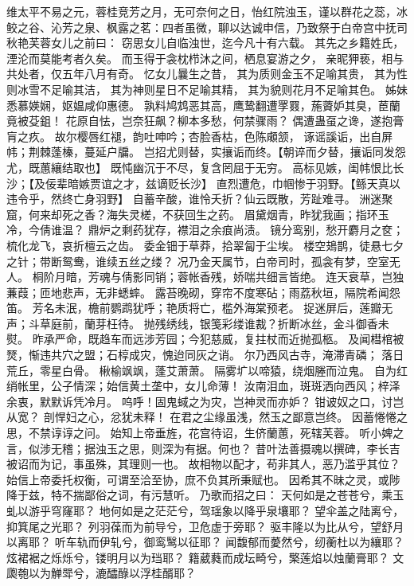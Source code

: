 \documentclass[12pt,oneside]{book}
\begin{document}
维太平不易之元，蓉桂竞芳之月，无可奈何之日，怡红院浊玉，谨以群花之蕊，冰鲛之谷、沁芳之泉、枫露之茗：四者虽微，聊以达诚申信，乃致祭于白帝宫中抚司秋艳芙蓉女儿之前曰：
窃思女儿自临浊世，迄今凡十有六载。
其先之乡籍姓氏，湮沦而莫能考者久矣。
而玉得于衾枕栉沐之间，栖息宴游之夕，
亲昵狎亵，相与共处者，仅五年八月有奇。
忆女儿曩生之昔，
其为质则金玉不足喻其贵，
其为性则冰雪不足喻其洁，
其为神则星日不足喻其精，
其为貌则花月不足喻其色。
姊妹悉慕媖娴，妪媪咸仰惠德。
孰料鸠鸩恶其高，鹰鸷翻遭罦罬，葹薋妒其臭，茞蘭竟被芟鉏！
花原自怯，岂奈狂飙？柳本多愁，何禁骤雨？
偶遭蛊虿之谗，遂抱膏肓之疚。
故尔樱唇红褪，韵吐呻吟；杏脸香枯，色陈顑颔，
诼谣謑诟，出自屏帏；荆棘蓬榛，蔓延户牖。
岂招尤则替，实攘诟而终。【朝谇而夕替，攘诟同发怨尤，既蕙纕结取也】
既忳幽沉于不尽，复含罔屈于无穷。
高标见嫉，闺帏恨比长沙；【及佞辈暗嫉贾谊之才，兹谪贬长沙】
直烈遭危，巾帼惨于羽野。【鲧天真以违令乎，然终亡身羽野】
自蓄辛酸，谁怜夭折？仙云既散，芳趾难寻。
洲迷聚窟，何来却死之香？海失灵槎，不获回生之药。
眉黛烟青，昨犹我画；指环玉冷，今倩谁温？
鼎炉之剩药犹存，襟泪之余痕尚渍。
镜分鸾别，愁开麝月之奁；梳化龙飞，哀折檀云之齿。
委金钿于草莽，拾翠匐于尘埃。
楼空鳷鹊，徒悬七夕之针；带断鸳鸯，谁续五丝之缕？
况乃金天属节，白帝司时，孤衾有梦，空室无人。
桐阶月暗，芳魂与倩影同销；蓉帐香残，娇喘共细言皆绝。
连天衰草，岂独蒹葭；匝地悲声，无非蟋蟀。
露苔晚砌，穿帘不度寒砧；雨荔秋垣，隔院希闻怨笛。
芳名未泯，檐前鹦鹉犹呼；艳质将亡，槛外海棠预老。
捉迷屏后，莲瓣无声；斗草庭前，蘭芽枉待。
抛残绣线，银笺彩缕谁裁？折断冰丝，金斗御香未熨。
昨承严命，既趋车而远涉芳园；今犯慈威，复拄杖而近抛孤柩。
及闻槥棺被燹，惭违共穴之盟；石椁成灾，愧迨同灰之诮。
尔乃西风古寺，淹滞青磷；
落日荒丘，零星白骨。
楸榆飒飒，蓬艾萧萧。
隔雾圹以啼猿，绕烟塍而泣鬼。
自为红绡帐里，公子情深；始信黄土垄中，女儿命薄！
汝南泪血，斑斑洒向西风；梓泽余衷，默默诉凭冷月。
呜呼！固鬼蜮之为灾，岂神灵而亦妒？
钳诐奴之口，讨岂从宽？
剖悍妇之心，忿犹未释！
在君之尘缘虽浅，然玉之鄙意岂终。
因蓄惓惓之思，不禁谆谆之问。
始知上帝垂旌，花宫待诏，生侪蘭蕙，死辖芙蓉。
听小婢之言，似涉无稽；据浊玉之思，则深为有据。何也？
昔叶法善摄魂以撰碑，李长吉被诏而为记，事虽殊，其理则一也。
故相物以配才，苟非其人，恶乃滥乎其位？
始信上帝委托权衡，可谓至洽至协，庶不负其所秉赋也。
因希其不昧之灵，或陟降于兹，特不揣鄙俗之词，有污慧听。
乃歌而招之曰：
天何如是之苍苍兮，乘玉虬以游乎穹窿耶？
地何如是之茫茫兮，驾瑶象以降乎泉壤耶？
望伞盖之陆离兮，抑箕尾之光耶？
列羽葆而为前导兮，卫危虚于旁耶？
驱丰隆以为比从兮，望舒月以离耶？
听车轨而伊轧兮，御鸾鹥以征耶？
闻馥郁而薆然兮，纫蘅杜以为纕耶？
炫裙裾之烁烁兮，镂明月以为珰耶？
籍葳蕤而成坛畸兮，檠莲焰以烛蘭膏耶？
文瓟匏以为觯斝兮，漉醽醁以浮桂醑耶？
\end{document}

